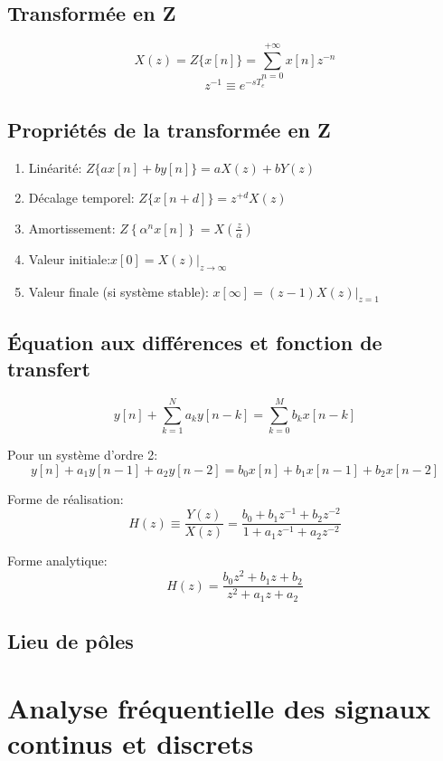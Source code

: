 \documentclass[10pt, twocolumn]{article}
\begin{document}
		\subsection*{Transformée en Z}
			\[X(z)=Z\{x[n]\}=\sum_{n=0}^{+\infty} x[n] z^{-n}\]
			\[z^{-1} \equiv e^{-s T_{e}}\]
			
			
		\subsection*{Propriétés de la transformée en Z}
			
			\begin{enumerate}
				\item Linéarité: $Z\{a x[n]+b y[n]\}=a X(z)+b Y(z)$
				\item Décalage temporel: $Z\{x[n+d]\}=z^{+d} X(z)$
				\item Amortissement: $Z\left\{\alpha^{n} x[n]\right\}=X\left(\frac{z}{\alpha}\right)$
				\item Valeur initiale:$x[0]=\left.X(z)\right|_{z \rightarrow \infty}$
				\item Valeur finale (si système stable): $x[\infty]=\left.(z-1) X(z)\right|_{z=1}$
			\end{enumerate}
			
		\subsection*{Équation aux différences et fonction de transfert}
			
			\[y[n]+\sum_{k=1}^{N} a_{k} y[n-k]=\sum_{k=0}^{M} b_{k} x[n-k]\]
			
			Pour un système d'ordre 2:
			\[y[n]+a_{1} y[n-1]+a_{2} y[n-2]=b_{0} x[n]+b_{1} x[n-1]+b_{2} x[n-2]\]
			
			Forme de réalisation:
			\[H(z) \equiv \frac{Y(z)}{X(z)}=\frac{b_{0}+b_{1} z^{-1}+b_{2} z^{-2}}{1+a_{1} z^{-1}+a_{2} z^{-2}}\]
			
			Forme analytique:
			\[H(z)=\frac{b_{0} z^{2}+b_{1} z+b_{2}}{z^{2}+a_{1} z+a_{2}}\]
			
		\subsection*{Lieu de pôles}
			
			
	\section*{Analyse fréquentielle des signaux continus et discrets}
	
\end{document}
